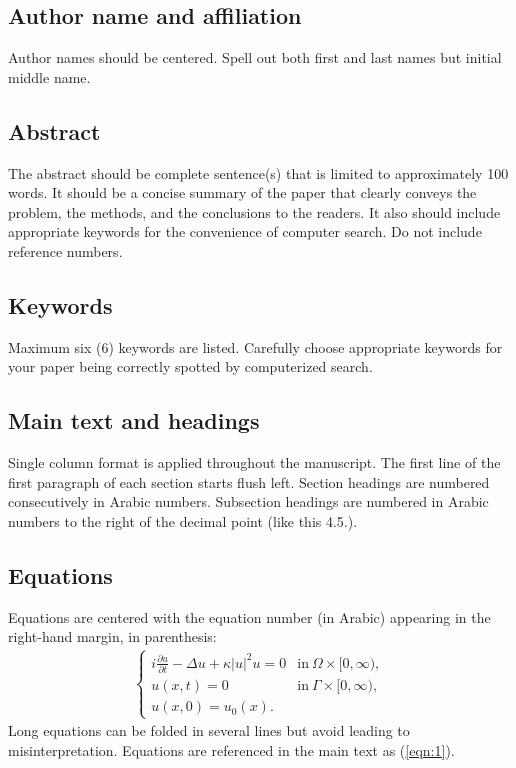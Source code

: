 \documentclass[journal]{jasse-modern}
\begin{document}
\subsection{Author name and affiliation}
Author names should be centered.
Spell out both first and last names but initial middle name.

\subsection{Abstract}
The abstract should be complete sentence(s) that is limited to approximately 100 words.
It should be a concise summary of the paper that clearly conveys the problem, the methods, and the conclusions to the readers.
It also should include appropriate keywords for the convenience of computer search.
Do not include reference numbers.

\subsection{Keywords}
Maximum six (6) keywords are listed.
Carefully choose appropriate keywords for your paper being correctly spotted by computerized search.

\subsection{Main text and headings}
Single column format is applied throughout the manuscript.
The first line of the first paragraph of each section starts flush left.
Section headings are numbered consecutively in Arabic numbers.
Subsection headings are numbered in Arabic numbers to the right of the decimal point (like this 4.5.).

\subsection{Equations}
Equations are centered with the equation number (in Arabic) appearing in the right-hand margin, in
parenthesis:
\begin{align}\label{eqn:1}
  \left\{
  \begin{array}{ll}
    i\displaystyle\frac{\partial u}{\partial t}-\Delta u+\kappa|u|^2u=0&\mbox{in}~\Omega\times[0,\infty),\\[2mm]
    u(x,t)=0&\mbox{in}~\Gamma\times[0,\infty),\\[2mm]
    u(x,0)=u_0(x).
  \end{array}
  \right.
\end{align}
Long equations can be folded in several lines but avoid leading to misinterpretation.
Equations are referenced in the main text as (\ref{eqn:1}).
\end{document}
